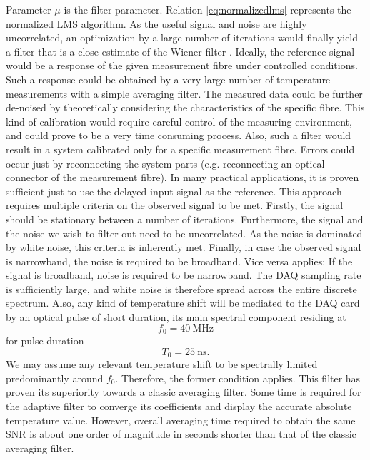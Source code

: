 \documentclass{standalone}
\begin{document}
Parameter $\mu$ is the filter parameter. Relation \ref{eq:normalizedlms} represents the normalized LMS algorithm. As the useful signal and noise are highly uncorrelated, an optimization by a large number of iterations would finally yield a filter that is a close estimate of the Wiener filter \cite{haykin2003least}. Ideally, the reference signal would be a response of the given measurement fibre under controlled conditions. Such a response could be obtained by a very large number of temperature measurements with a simple averaging filter. The measured data could be further de-noised by theoretically considering the characteristics of the specific fibre. This kind of calibration would require careful control of the measuring environment, and could prove to be a very time consuming process. Also, such a filter would result in a system calibrated only for a specific measurement fibre. Errors could occur just by reconnecting the system parts (e.g. reconnecting an optical connector of the measurement fibre). In many practical applications, it is proven sufficient just to use the delayed input signal as the reference. This approach requires multiple criteria on the observed signal to be met. Firstly, the signal should be stationary between a number of iterations. Furthermore, the signal and the noise we wish to filter out need to be uncorrelated. As the noise is dominated by white noise, this criteria is inherently met. Finally, in case the observed signal is narrowband, the noise is required to be broadband. Vice versa applies; If the signal is broadband, noise is required to be narrowband. The DAQ sampling rate is sufficiently large, and white noise is therefore spread across the entire discrete spectrum. Also, any kind of temperature shift will be mediated to the DAQ card by an optical pulse of short duration, its main spectral component residing at
\begin{equation}
f_0 = \SI{40}{\mega \hertz}
\end{equation}
for pulse duration
\begin{equation}
T_0 = \SI{25}{\nano \second} \textrm{.}
\end{equation}
We may assume any relevant temperature shift to be spectrally limited predominantly around $f_0$. Therefore, the former condition applies. This filter has proven its superiority towards a classic averaging filter. Some time is required for the adaptive filter to converge its coefficients and display the accurate absolute temperature value. However, overall averaging time required to obtain the same SNR is about one order of magnitude in seconds shorter than that of the classic averaging filter. \\
\end{document}
